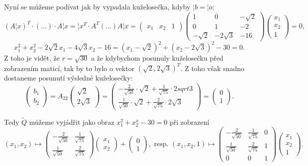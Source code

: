 \documentclass[12pt]{article}                   %
\begin{document}
\begin{priklad}[10.6]
\begin{reseni}
		Nyní se můžeme podívat jak by vypadala kuželosečka, kdyby $¦b = ¦o$:
		$$ (A¦x)^T · (…) · A¦x = ¦x^T · A^T(…)A ¦x = \begin{pmatrix} x_1 & x_2 & 1 \end{pmatrix} \begin{pmatrix} 1 & 0 & -\sqrt{2} \\ 0 & 1 & -2 \\ -\sqrt{2} & -2\sqrt{3} & -16 \end{pmatrix} \begin{pmatrix} x_1 \\ x_2 \\ 1 \end{pmatrix} = 0, $$
		$$ x_1^2 + x_2^2 - 2\sqrt{2}x_1 - 4\sqrt{3}x_2 - 16 = (x_1 - \sqrt{2})^2 + (x_2 - 2\sqrt{3})^2 - 30 = 0. $$
		Z toho je vidět, že $r = \sqrt{30}$ a že kdybychom posunuly kuželosečku před zobrazením maticí, tak by to bylo o vektor $(\sqrt{2}, 2\sqrt{3})^T$. Z toho však snadno dostaneme posunutí výsledné kuželosečky:
		$$ \begin{pmatrix} b_1 \\ b_2 \end{pmatrix} = A_{22} \begin{pmatrix} \sqrt{2} \\ 2\sqrt{3} \end{pmatrix} = \begin{pmatrix} -\frac{2}{\sqrt{50}}·\sqrt{2} + \frac{1}{\sqrt{75}}·2sqrt{3} \\ \frac{1}{\sqrt{50}}·\sqrt{2} + \frac{2}{\sqrt{75}}·2\sqrt{3} \end{pmatrix} = \begin{pmatrix} 0 \\ 1 \end{pmatrix}. $$

		Tedy $\tilde Q$ můžeme vyjádřit jako obraz $x_1^2 + x_2^x - 30 = 0$ při zobrazení
		$$ (x_1, x_2) \mapsto \begin{pmatrix} -\frac{2}{\sqrt{50}} & \frac{1}{\sqrt{75}} \\ \frac{1}{\sqrt{50}} & \frac{2}{\sqrt{75}} \end{pmatrix} \begin{pmatrix} x_1 \\ x_2 \end{pmatrix} + \begin{pmatrix} 0 \\ 1 \end{pmatrix}, \text{ resp. } (x_1, x_2, 1) \mapsto \begin{pmatrix} -\frac{2}{\sqrt{50}} & \frac{1}{\sqrt{75}} & 0 \\ \frac{1}{\sqrt{50}} & \frac{2}{\sqrt{75}} & 1 \\ 0 & 0 & 1 \end{pmatrix} \begin{pmatrix} x_1 \\ x_2 \\ 1 \end{pmatrix} . $$
	\end{reseni}


\end{priklad}
\end{document}
